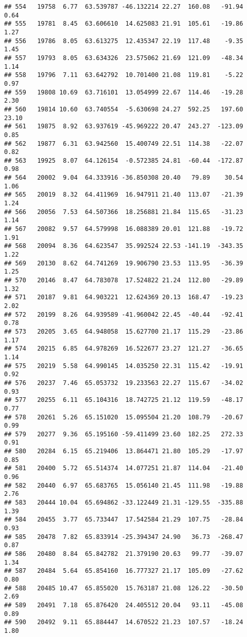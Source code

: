 \documentclass[]{article}
\begin{document}
\begin{verbatim}
## 554   19758  6.77  63.539787 -46.132214 22.27  160.08   -91.94  0.64
## 555   19781  8.45  63.606610  14.625083 21.91  105.61   -19.86  1.27
## 556   19786  8.05  63.613275  12.435347 22.19  117.48    -9.35  1.45
## 557   19793  8.05  63.634326  23.575062 21.69  121.09   -48.34  1.14
## 558   19796  7.11  63.642792  10.701400 21.08  119.81    -5.22  0.97
## 559   19808 10.69  63.716101  13.054999 22.67  114.46   -19.28  2.30
## 560   19814 10.60  63.740554  -5.630698 24.27  592.25   197.60 23.10
## 561   19875  8.92  63.937619 -45.969222 20.47  243.27  -123.09  0.85
## 562   19877  6.31  63.942560  15.400749 22.51  114.38   -22.07  0.82
## 563   19925  8.07  64.126154  -0.572385 24.81  -60.44  -172.87  0.98
## 564   20002  9.04  64.333916 -36.850308 20.40   79.89    30.54  1.06
## 565   20019  8.32  64.411969  16.947911 21.40  113.07   -21.39  1.24
## 566   20056  7.53  64.507366  18.256881 21.84  115.65   -31.23  1.14
## 567   20082  9.57  64.579998  16.088389 20.01  121.88   -19.72  1.91
## 568   20094  8.36  64.623547  35.992524 22.53 -141.19  -343.35  1.22
## 569   20130  8.62  64.741269  19.906790 23.53  113.95   -36.39  1.25
## 570   20146  8.47  64.783078  17.524822 21.24  112.80   -29.89  1.32
## 571   20187  9.81  64.903221  12.624369 20.13  168.47   -19.23  2.02
## 572   20199  8.26  64.939589 -41.960042 22.45  -40.44   -92.41  0.78
## 573   20205  3.65  64.948058  15.627700 21.17  115.29   -23.86  1.17
## 574   20215  6.85  64.978269  16.522677 23.27  121.27   -36.65  1.14
## 575   20219  5.58  64.990145  14.035250 22.31  115.42   -19.91  0.92
## 576   20237  7.46  65.053732  19.233563 22.27  115.67   -34.02  0.93
## 577   20255  6.11  65.104316  18.742725 21.12  119.59   -48.17  0.77
## 578   20261  5.26  65.151020  15.095504 21.20  108.79   -20.67  0.99
## 579   20277  9.36  65.195160 -59.411499 23.60  182.25   272.33  0.91
## 580   20284  6.15  65.219406  13.864471 21.80  105.29   -17.97  0.85
## 581   20400  5.72  65.514374  14.077251 21.87  114.04   -21.40  0.96
## 582   20440  6.97  65.683765  15.056140 21.45  111.98   -19.88  2.76
## 583   20444 10.04  65.694862 -33.122449 21.31 -129.55  -335.88  1.39
## 584   20455  3.77  65.733447  17.542584 21.29  107.75   -28.84  0.93
## 585   20478  7.82  65.833914 -25.394347 24.90   36.73  -268.47  0.87
## 586   20480  8.84  65.842782  21.379190 20.63   99.77   -39.07  1.34
## 587   20484  5.64  65.854160  16.777327 21.17  105.09   -27.62  0.80
## 588   20485 10.47  65.855020  15.763187 21.08  126.22   -30.50  2.69
## 589   20491  7.18  65.876420  24.405512 20.04   93.11   -45.08  0.89
## 590   20492  9.11  65.884447  14.670522 21.23  107.57   -18.24  1.80

\end{verbatim}
\end{document}
